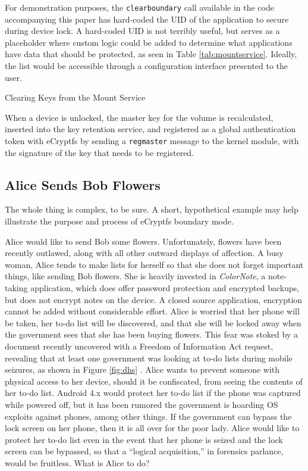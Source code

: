 For demonstration purposes, the \texttt{clearboundary} call available in the code accompanying this paper has hard-coded the UID of
the application to secure during device lock. A hard-coded UID is not terribly useful, but serves as a placeholder where custom
logic could be added to determine what applications have data that should be protected, as seen in Table \ref{tab:mountservice}.
Ideally, the list would be accessible through a configuration interface presented to the user.

\begin{table}[!htb]

\caption{Clearing Keys from the Mount Service}
\label{tab:mountservice}
\end{table}

When a device is unlocked, the master key for the volume is recalculated, inserted into the key retention service, and registered
as a global authentication token with eCryptfs by sending a \texttt{regmaster} message to the kernel module, with the signature of
the key that needs to be registered. 

\subsection{Alice Sends Bob Flowers}
\label{sec:alicebob}
The whole thing is complex, to be sure. A short, hypothetical example may help illustrate the purpose and process of eCryptfs boundary mode.  

Alice would like to send Bob some flowers. Unfortunately, flowers have been recently outlawed, along with all other outward displays
of affection. A busy woman, Alice tends to make lists for herself so that she does not forget important things, like sending Bob
flowers. She is heavily invested in \emph{ColorNote}, a note-taking application, which does offer password protection and encrypted
backups, but does not encrypt notes on the device. A closed source application, encryption cannot be added without considerable
effort. Alice is worried that her phone will be taken, her to-do list will be discovered, and that she will be locked away when the
government sees that she has been buying flowers. This fear was stoked by a document recently uncovered with a Freedom of
Information Act request, revealing that at least one government was looking at to-do lists during mobile seizures, as shown in
Figure \ref{fig:dhs} \cite{dhsfoia}. Alice wants to prevent someone with physical access to her device, should it be confiscated,
from seeing the contents of her to-do list. Android 4.x would protect her to-do list if the phone was captured while powered off, but
it has been rumored the government is hoarding OS exploits against phones, among other things. If the government can bypass the lock
screen on her phone, then it is all over for the poor lady. Alice would like to protect her to-do list even in the event that her
phone is seized and the lock screen can be bypassed, so that a ``logical acquisition,'' in forensics parlance, would be fruitless.
What is Alice to do?

